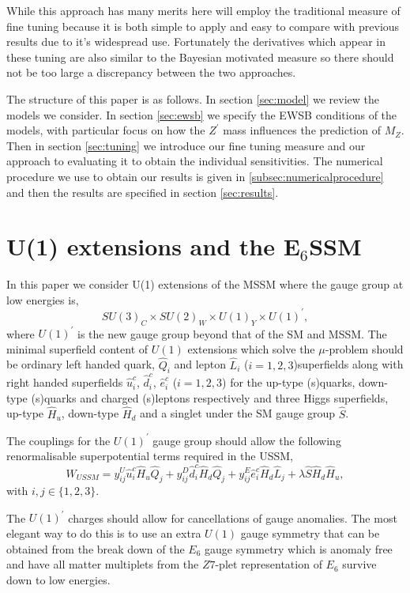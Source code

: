 \documentclass[preprint,amsmath,amssymb,aps,superscriptaddress,prd,showpacs,floatfix]{revtex4-1}
\newcommand{\be}{\begin{equation}}
\newcommand{\ee}{\end{equation}}
\begin{document}
While this approach has many merits here will employ the traditional
measure of fine tuning because it is both simple to apply and easy to
compare with previous results due to it's widespread use.  Fortunately
the derivatives which appear in these tuning are also similar to the
Bayesian motivated measure so there should not be too large a discrepancy between the two approaches.


The structure of this paper is as follows.  In section \ref{sec:model} we review the models we consider.  In section \ref{sec:ewsb} we specify the EWSB conditions of the models, with particular focus on how the $Z^\prime$ mass influences the prediction of $M_Z$.  Then in section \ref{sec:tuning} we introduce our fine tuning measure and our approach to evaluating it to obtain the individual sensitivities.  The numerical procedure we use to obtain our results is given in \ref{subsec:numericalprocedure} and then the results are specified in section \ref{sec:results}. 





 

\section{\label{sec:model}U(1) extensions and the E$_6$SSM}
In this paper we consider U(1) extensions of the MSSM where the gauge group at low energies is,
 \be
SU(3)_C\times SU(2)_W\times U(1)_Y\times U(1)^\prime, \ee 
where $U(1)^\prime$ is the new gauge group beyond that of the SM and MSSM. The minimal superfield content of $U(1)$ extensions which solve the $\mu$-problem should be ordinary left handed quark, $\hat{Q}_i$ and lepton $\hat{L}_i$ ($i=1,2,3$)superfields along with right handed superfields $\hat{u}^c_i$, $\hat{d}^c_i$,  $\hat{e}^c_i$ ($i=1,2,3$) for the up-type (s)quarks, down-type (s)quarks and charged (s)leptons respectively and three Higgs superfields, up-type $\hat{H}_u$, down-type $\hat{H}_d$ and a singlet under the SM gauge group $\hat{S}$.

  The couplings for the $U(1)^\prime$ gauge group should allow the following renormalisable superpotential terms required in the USSM,
\be
W_{USSM} =  y^U_{ij} \hat{u}^c_i \hat{H}_u \hat{Q}_j + y^D_{ij} \hat{d}^c_i \hat{H}_d \hat{Q}_j + y^E_{ij} \hat{e}^c_i \hat{H}_d \hat{L}_j + \lambda \hat{S} \hat{H}_d \hat{H}_u,
\ee with $i,j \in \{1,2,3\}$.  


The $U(1)^\prime$ charges should allow for cancellations of gauge
anomalies. The most elegant way to do this is to use an extra $U(1)$
gauge symmetry that can be obtained from the break down of the $E_6$
gauge symmetry which is anomaly free and have all matter multiplets
from the $Z7$-plet representation of $E_6$ survive down to low energies.
\end{document}
